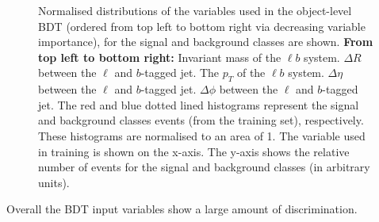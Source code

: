 \begin{figure}
  
    \caption{Normalised distributions of the variables used in the object-level BDT (ordered from top left to bottom right via decreasing variable importance), for the signal and background classes are shown. \textbf{From top left to bottom right:} Invariant mass of the $\ell b$ system. $\Delta R$ between the $\ell$ and $b$-tagged jet. The $p_{T}$ of the $\ell b$ system. $\Delta \eta$ between the $\ell$ and $b$-tagged jet. $\Delta \phi$ between the $\ell$ and $b$-tagged jet. The red and blue dotted lined histograms represent the signal and background classes events (from the training set), respectively. These histograms are normalised to an area of 1. The variable used in training is shown on the x-axis. The y-axis shows the relative number of events for the signal and background classes (in arbitrary units). }
    \label{fig:norm-object-bdt-vars}
\end{figure}

Overall the BDT input variables show a large amount of discrimination. \\

